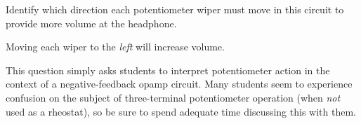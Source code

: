 

Identify which direction each potentiometer wiper must move in this circuit to provide more volume at the headphone.







Moving each wiper to the {\it left} will increase volume.







This question simply asks students to interpret potentiometer action in the context of a negative-feedback opamp circuit.  Many students seem to experience confusion on the subject of three-terminal potentiometer operation (when {\it not} used as a rheostat), so be sure to spend adequate time discussing this with them.



